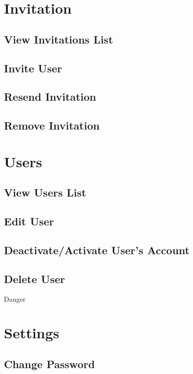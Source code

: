 \documentclass[a4paper,12pt]{article}
\begin{document}
\newpage


\newpage


\newpage


\newpage


\section{Invitation}

\subsection{View Invitations List}
\subsection{Invite User}
\subsection{Resend Invitation}
\subsection{Remove Invitation}

\section{Users}

\subsection{View Users List}
\subsection{Edit User}
\subsection{Deactivate/Activate User's Account}
\subsection{Delete User}
Danger

\section{Settings}
\subsection{Change Password}
\end{document}
